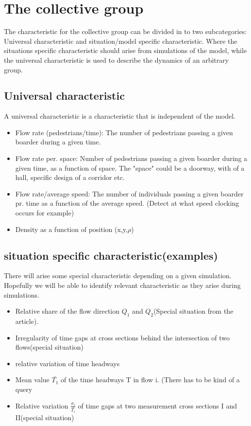 \documentclass[10pt,a4paper]{article}
\begin{document}
\section{The collective group}
The characteristic for the collective group can be divided in to two subcategories: Universal characteristic and situation/model specific characteristic. Where the situations specific characteristic should arise from simulations of the model, while the universal characteristic is used to describe the dynamics of an arbitrary group. 

\subsection{Universal characteristic}
A universal characteristic is a characteristic that is independent of the model.
\begin{itemize}
\item Flow rate (pedestrians/time): The number of pedestrians passing a given boarder during a given time.
\item Flow rate per. space: Number of pedestrians passing a given boarder during a given time, as a function of space. The "space" could be a doorway, with of a hall, specific design of a corridor etc.
\item Flow rate/average speed: The number of individuals passing a given boarder pr. time as a function of the average speed. (Detect at what speed clocking occurs for example)
\item Density as a function of position (x,y,$\rho$)
\end{itemize}


\subsection{situation specific characteristic(examples)}
There will arise some special characteristic depending on a given simulation. Hopefully we will be able to identify relevant characteristic as they arise during simulations.

\begin{itemize}
\item Relative share of the flow direction $Q_1$ and $Q_2$(Special situation from the article).
\item Irregularity of time gaps at cross sections behind the intersection of two flows(special situation)
\item relative variation of time headways
\item Mean value $\bar{T_1}$ of the time headways T in flow i. (There has to be kind of a query 
\item Relative variation $\frac{\sigma_i}{\bar{T_i}}$ of time gaps at two measurement cross sections I and II(special situation)
\end{itemize}
\end{document}
